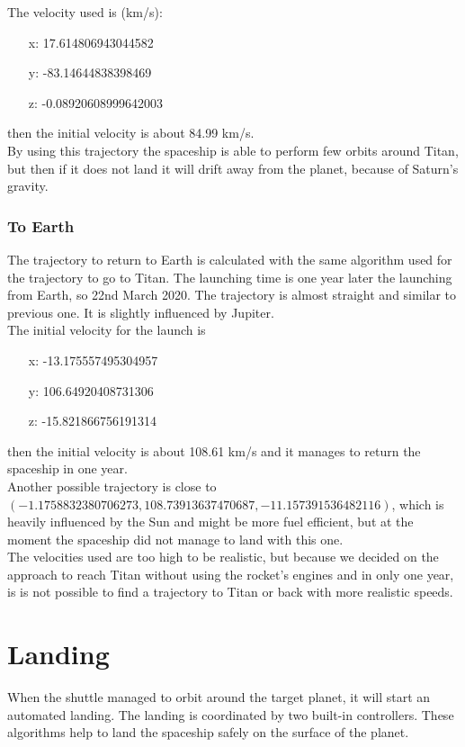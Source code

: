 \documentclass[10pt,a4paper]{article}
\begin{document}
	The velocity used is (km/s):
	\begin{enumerate}
		\item[x:] 17.614806943044582
		\item[y:] -83.14644838398469
		\item[z:] -0.08920608999642003
	\end{enumerate}    
	then the initial velocity is about 84.99 km/s. \\
	By using this trajectory the spaceship is able to perform few orbits around Titan, but then if it does not land it will drift away from the planet, because of Saturn's gravity.
	
	\subsubsection{To Earth}
	The trajectory to return to Earth is calculated with the same algorithm used for the trajectory to go to Titan. The launching time is one year later the launching from Earth, so 22nd March 2020. The trajectory is almost straight and similar to previous one. It is slightly influenced by Jupiter.\\
	The initial velocity for the launch is
	\begin{enumerate}
		\item[x:] -13.175557495304957
		\item[y:] 106.64920408731306
		\item[z:] -15.821866756191314
	\end{enumerate}    
	then the initial velocity is about 108.61 km/s and it manages to return the spaceship in one year. \\
	Another possible trajectory is close to $(-1.1758832380706273, 108.73913637470687, -11.157391536482116)$, which is heavily influenced by the Sun and might be more fuel efficient, but at the moment the spaceship did not manage to land with this one.\\
	The velocities used are too high to be realistic, but because we decided on the approach to reach Titan without using the rocket's engines and in only one year, is is not possible to find a trajectory to Titan or back with more realistic speeds.
	
	\section{Landing}
	When the shuttle managed to orbit around the target planet, it will start an automated landing. The landing is coordinated by two built-in controllers. These algorithms help to land the spaceship safely on the surface of the planet.
	
\end{document}
